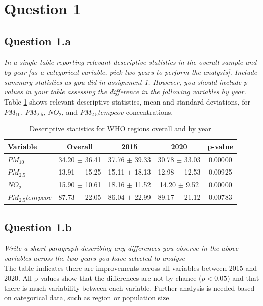 \section[Question 1]{Question 1}
\subsection{Question 1.a}
\textit{In a single table reporting relevant descriptive statistics in the overall sample
and by year [as a categorical variable, pick two years to perform the analysis].
Include summary statistics as you did in assignment 1. However, you should
include p-values in your table assessing the difference in the following variables
by year.}\\

\noindent Table \ref{tab:20152020_descriptives} shows relevant descriptive statistics, mean and standard deviations, for $PM_{10}$, $PM_{2.5}$, $NO_2$, and $PM_{2.5}tempcov$ concentrations. 

\begin{table}[ht]
    \centering
    \begin{tabular}{lcccc}
        \toprule
        Variable & Overall & 2015 & 2020 & p-value \\
        \midrule
        $PM_{10}$ & 34.20 $\pm$ 36.41 & 37.76 $\pm$ 39.33 & 30.78 $\pm$ 33.03 & 0.00000 \\
        $PM_{2.5}$ & 13.91 $\pm$ 15.25 & 15.11 $\pm$ 18.13 & 12.98 $\pm$ 12.53 & 0.00925 \\
        $NO_2$ & 15.90 $\pm$ 10.61 & 18.16 $\pm$ 11.52 & 14.20 $\pm$ 9.52 & 0.00000 \\
        $PM_{2.5}tempcov$ & 87.73 $\pm$ 22.05 & 86.04 $\pm$ 22.99 & 89.17 $\pm$ 21.12 & 0.00783 \\
        \bottomrule
\end{tabular}
\caption{Descriptive statistics for WHO regions overall and by year}
\label{tab:20152020_descriptives}
\end{table}


\subsection{Question 1.b}
\textit{Write a short paragraph describing any differences you observe in the above
variables across the two years you have selected to analyse} \\

\noindent The table indicates there are improvements across all variables between 2015 and 2020. All p-values show that the differences are not by chance ($p < 0.05$) and that there is much variability between each variable. Further analysis is needed based on categorical data, such as region or population size.


\newpage